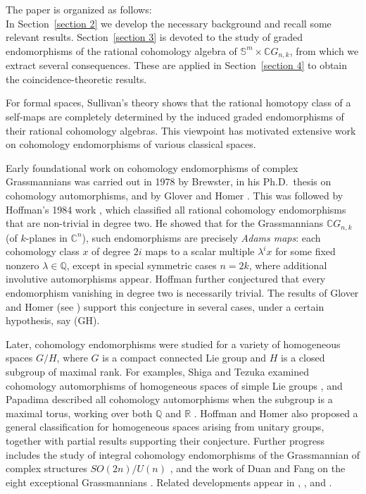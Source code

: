 \documentclass{amsart}
\newcommand{\secref}[1]{Section~\ref{#1}}
\begin{document}
	The paper is organized as follows: \\
	In \secref{section 2} we develop the necessary background and recall some relevant results. \secref{section 3} is devoted to the study of graded endomorphisms of the rational cohomology algebra of $\mathbb S^{m}\times \mathbb C G_{n,k}$, from which we extract several consequences. These are applied in \secref{section 4} to obtain the coincidence-theoretic results.
	
	\iffalse For formal spaces, Sullivan’s theory shows that the rational homotopy class of a self-maps are completely determined by the induced graded endomorphisms of their rational cohomology algebras. This viewpoint has motivated extensive work on cohomology endomorphisms of various classical  spaces.
	
	
	Early foundational work on cohomology endomorphisms of complex Grassmannians
	was carried out in 1978 by Brewster, in his Ph.D.\ thesis \cite{brewster} on cohomology
	automorphisms, and by Glover and Homer \cite{glover-homer}.
	This was followed by Hoffman’s 1984 work
	\cite{hoffman}, which classified all rational cohomology endomorphisms that are
	non-trivial in degree two. He showed that for the Grassmannians $\mathbb CG_{n,k}$ (of $k$-planes in $\mathbb{C}^n$), such endomorphisms are precisely \emph{Adams maps}: each cohomology class $x$ of degree $2i$ maps to a scalar multiple $\lambda^i x$ for some fixed nonzero $\lambda \in \mathbb{Q}$, except in special symmetric cases $n=2k$, where additional involutive automorphisms appear. Hoffman further conjectured that every endomorphism vanishing in degree two is necessarily trivial. The results of Glover and Homer (see \cite{glover-homer}) support this conjecture in several cases, under a certain hypothesis, say (GH).
	
	
	Later, cohomology endomorphisms were studied for a variety of homogeneous
	spaces $G/H$, where $G$ is a compact connected Lie group and $H$ is a closed
	subgroup of maximal rank. For examples,
	Shiga and Tezuka examined cohomology
	automorphisms of homogeneous spaces of simple Lie groups \cite{shiga-tezuka2}, and Papadima described all cohomology automorphisms when the subgroup is a maximal torus,
	working over both $\mathbb Q$ and $\mathbb R$ \cite{Papadima}. Hoffman and Homer also
	proposed a general classification for homogeneous spaces arising from unitary
	groups, together with partial results supporting their conjecture. Further
	progress includes the study of integral cohomology endomorphisms of the Grassmannian of complex structures
	$SO(2n)/U(n)$ \cite{duan}, and the work of Duan and Fang on the eight exceptional
	Grassmannians \cite{duan-fang}. Related developments appear in \cite{duan-zhao}, \cite{lin}, and \cite{goswami-sarkar}.
	
\end{document}
